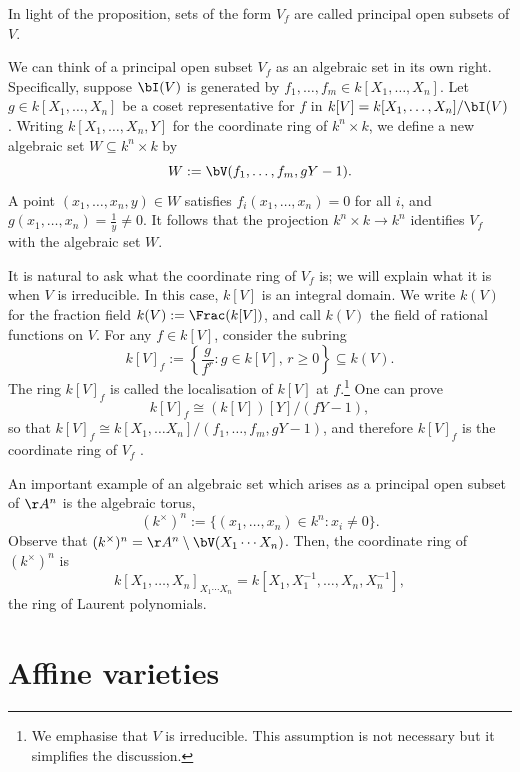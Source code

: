 \documentclass[12pt]{amsart}
\theoremstyle{plain}
\begin{document}
In light of the proposition, sets of the form $V_f$ are called principal open subsets of $V$.

We can think of a principal open subset $V_f$ as an algebraic set in its own right.
Specifically, suppose $\bI(V)$ is generated by $f_1, \ldots, f_m \in k[X_1, \ldots, X_n]$.
Let $g \in k[X_1, \ldots, X_n]$ be a coset representative for $f$ in $k[V] = k[X_1, \ldots, X_n]/\bI(V)$.
Writing $k[X_1, \ldots, X_n, Y]$ for the coordinate ring of $k^n \times k$, we define a new algebraic set $W \subseteq k^n \times k$ by 
$$W:=\bV(f_1, \ldots, f_m, g Y - 1).$$
A point $(x_1, \ldots, x_n, y) \in W$ satisfies $f_i(x_1, \ldots, x_n) = 0$ for all $i$, and  $g(x_1, \ldots, x_n) = \frac{1}{y} \ne 0$.
It follows that the projection $k^n \times k \to k^n$ identifies $V_f$ with the algebraic set $W$.

It is natural to ask what the coordinate ring of $V_f$ is; we will explain what it is when $V$ is irreducible.
In this case, $k[V]$ is an integral domain.
We write $k(V)$ for the fraction field $k(V):=\Frac(k[V])$, and call $k(V)$ the field of rational functions on $V$.
For any $f \in k[V]$, consider the subring
$$k[V]_f := \left\{\frac{g}{f^r} : g \in k[V], \, r \ge 0\right\} \subseteq k(V).$$
The ring $k[V]_f$ is called the localisation of $k[V]$ at $f$.\footnote{We emphasise that $V$ is irreducible. This assumption is not necessary but it simplifies the discussion.}
One can prove 
$$k[V]_f \cong (k[V])[Y] / (f Y -1),$$
so that $k[V]_f \cong k[X_1, \ldots X_n]/(f_1, \ldots, f_m, gY - 1)$, and therefore $k[V]_f$ is the coordinate ring of $V_f$ \cite[Lemma 1.13]{Milne13}.

An important example of an algebraic set which arises as a principal open subset of $\AA^n$ is the algebraic torus,
$$(k^\times)^n := \{(x_1, \ldots, x_n) \in k^n : x_i \ne 0\}.$$
Observe that $(k^\times)^n = \AA^n \setminus \bV(X_1 \cdots X_n)$.
Then, the coordinate ring of $(k^\times)^n$ is 
$$k[X_1, \ldots, X_n]_{X_1 \cdots X_n} = k[X_1, X_1^{-1}, \ldots, X_n, X_n^{-1}],$$
the ring of Laurent polynomials.

\newpage
\section{Affine varieties}
\end{document}
